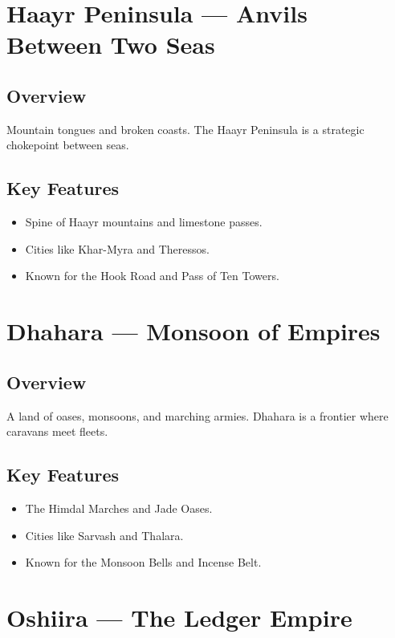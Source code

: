 \section{Haayr Peninsula — Anvils Between Two Seas}
\label{sec:lore-haayr}

\subsection*{Overview}
Mountain tongues and broken coasts. The Haayr Peninsula is a strategic chokepoint between seas.

\subsection*{Key Features}
\begin{itemize}[leftmargin=*]
    \item Spine of Haayr mountains and limestone passes.
    \item Cities like Khar-Myra and Theressos.
    \item Known for the Hook Road and Pass of Ten Towers.
\end{itemize}

\section{Dhahara — Monsoon of Empires}
\label{sec:lore-dhahara}

\subsection*{Overview}
A land of oases, monsoons, and marching armies. Dhahara is a frontier where caravans meet fleets.

\subsection*{Key Features}
\begin{itemize}[leftmargin=*]
    \item The Himdal Marches and Jade Oases.
    \item Cities like Sarvash and Thalara.
    \item Known for the Monsoon Bells and Incense Belt.
\end{itemize}

\section{Oshiira — The Ledger Empire}
\label{sec:lore-oshiira}

